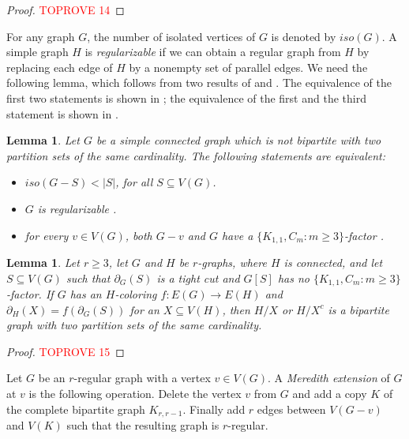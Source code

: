 \documentclass[a4paper,11pt]{article}
\newtheorem{lem}[defi]{Lemma}
\theoremstyle{remark}
\begin{document}
\begin{proof}\textcolor{red}{TOPROVE 14}\end{proof}

For any graph $ G $, the number of isolated vertices of $ G $ is denoted by $ iso(G) $.
A simple graph $ H $ is \emph{regularizable} if we can obtain a regular graph from $H $ by replacing each edge of $ H $ by a nonempty set of parallel edges. We need the following lemma, which follows from two results of \cite{Berge-Vergnas-1978} and \cite{Pulleyblank-1979}. The equivalence of the first two statements is shown in \cite{Berge-Vergnas-1978}; the equivalence of the first and the third statement is shown in \cite{Pulleyblank-1979}.

\begin{lem}\label{Lemma-regular=factor}
	Let $ G $ be a simple connected graph which is not bipartite with two partition sets of the same cardinality. The following statements are equivalent:
	\begin{itemize}
		\item  $ iso(G-S) < |S|  $, for all $ S \subseteq V(G)$.
		\item   $ G $ is regularizable \cite{Berge-Vergnas-1978}.
		\item for every $ v\in V(G) $, both $ G-v $ and $ G $ have a $ \{K_{1,1}, C_m\colon m\geq3\} $-factor \cite{Pulleyblank-1979}.
	\end{itemize}
\end{lem}


\begin{lem}\label{Lemma-contract-H-class1}
	Let $r\geq 3$, let $ G$ and $ H $ be $ r $-graphs, where $H$ is connected, and let $S \subseteq V(G) $ such that $ \partial_G(S) $ is a tight cut and $ G[S] $ has no $ \{K_{1,1}, C_m:m\geq3\} $-factor. If $ G $ has an $ H $-coloring $f\colon E(G)\to E(H)$
	and $\partial_H(X)=f(\partial_G(S))$ for an $X \subseteq V(H)$, then   $H/X$ or $H/X^c$ is a bipartite graph with two partition sets of the same cardinality.
\end{lem}
\begin{proof}\textcolor{red}{TOPROVE 15}\end{proof}

	Let  $G$ be an $r$-regular graph with a vertex $v\in V(G)$. A \emph{Meredith extension} of $ G $ at $ v $ is the following operation. Delete the vertex $ v $ from $ G $ and add a copy $K$ of the complete bipartite graph $ K_{r,r-1} $. Finally add $ r $ edges between $ V(G-v)$ and $ V(K) $ such that the resulting graph is $ r $-regular.
\end{document}
